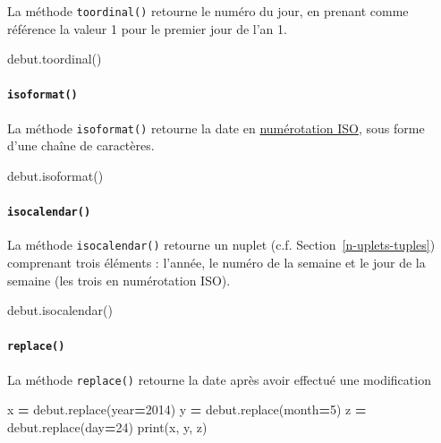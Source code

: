 \documentclass[12pt,]{book}
\newenvironment{Shaded}{\begin{snugshade}}{\end{snugshade}}
\newcommand{\DecValTok}[1]{\textcolor[rgb]{0.00,0.00,0.81}{#1}}
\newcommand{\OperatorTok}[1]{\textcolor[rgb]{0.81,0.36,0.00}{\textbf{#1}}}
\newcommand{\BuiltInTok}[1]{#1}
\newcommand{\NormalTok}[1]{#1}
\let\oldparagraph\paragraph
\renewcommand{\paragraph}[1]{\oldparagraph{#1}\mbox{}}
\numberwithin{equation}{section}
\numberwithin{countremarque}{section}
\begin{document}
La méthode \texttt{toordinal()} retourne le numéro du jour, en prenant
comme référence la valeur 1 pour le premier jour de l'an 1.

\begin{Shaded}
\begin{Highlighting}[]
\NormalTok{debut.toordinal()}
\end{Highlighting}
\end{Shaded}

\paragraph{\texorpdfstring{\texttt{isoformat()}}{isoformat()}}\label{isoformat}

La méthode \texttt{isoformat()} retourne la date en
\href{https://fr.wikipedia.org/wiki/Num\%C3\%A9rotation_ISO_des_semaines}{numérotation
ISO}, sous forme d'une chaîne de caractères.

\begin{Shaded}
\begin{Highlighting}[]
\NormalTok{debut.isoformat()}
\end{Highlighting}
\end{Shaded}

\paragraph{\texorpdfstring{\texttt{isocalendar()}}{isocalendar()}}\label{isocalendar}

La méthode \texttt{isocalendar()} retourne un nuplet (c.f.
Section~\ref{n-uplets-tuples}) comprenant trois éléments : l'année, le
numéro de la semaine et le jour de la semaine (les trois en numérotation
ISO).

\begin{Shaded}
\begin{Highlighting}[]
\NormalTok{debut.isocalendar()}
\end{Highlighting}
\end{Shaded}

\paragraph{\texorpdfstring{\texttt{replace()}}{replace()}}\label{replace}

La méthode \texttt{replace()} retourne la date après avoir effectué une
modification

\begin{Shaded}
\begin{Highlighting}[]
\NormalTok{x }\OperatorTok{=}\NormalTok{ debut.replace(year}\OperatorTok{=}\DecValTok{2014}\NormalTok{)}
\NormalTok{y }\OperatorTok{=}\NormalTok{ debut.replace(month}\OperatorTok{=}\DecValTok{5}\NormalTok{)}
\NormalTok{z }\OperatorTok{=}\NormalTok{ debut.replace(day}\OperatorTok{=}\DecValTok{24}\NormalTok{)}
\BuiltInTok{print}\NormalTok{(x, y, z)}
\end{Highlighting}
\end{Shaded}
\end{document}
